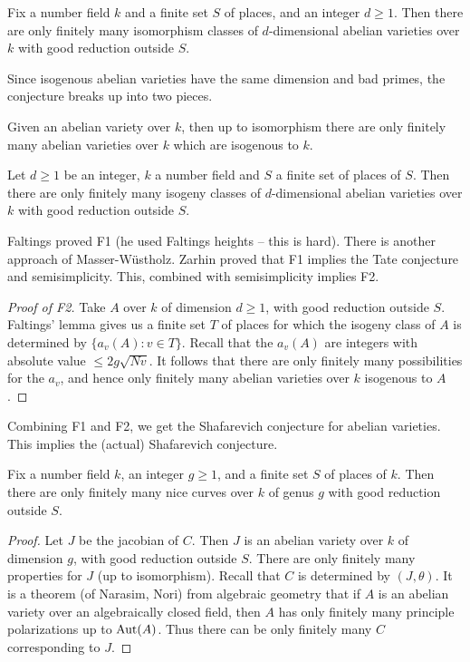 \begin{conjecture}
Fix a number field $k$ and a finite set $S$ of places, and an integer 
$d\geqslant 1$. Then there are only finitely many isomorphism classes of 
$d$-dimensional abelian varieties over $k$ with good reduction outside $S$. 
\end{conjecture}

Since isogenous abelian varieties have the same dimension and bad primes, 
the conjecture breaks up into two pieces. 

\begin{conjecture}[F1]
Given an abelian variety over $k$, then up to isomorphism there are only 
finitely many abelian varieties over $k$ which are isogenous to $k$. 
\end{conjecture}

\begin{conjecture}[F2]
Let $d\geqslant 1$ be an integer, $k$ a number field and $S$ a finite set of 
places of $S$. Then there are only finitely many isogeny classes of 
$d$-dimensional abelian varieties over $k$ with good reduction outside $S$. 
\end{conjecture}

Faltings proved F1 (he used Faltings heights -- this is hard). There is 
another approach of Masser-W\"ustholz. Zarhin proved that F1 implies the 
Tate conjecture and semisimplicity. This, combined with semisimplicity 
implies F2. 

\begin{proof}[Proof of F2]
Take $A$ over $k$ of dimension $d\geqslant 1$, with good reduction outside $S$. 
Faltings' lemma gives us a finite set $T$ of places for which the isogeny class 
of $A$ is determined by $\{a_v(A):v\in T\}$. Recall that the $a_v(A)$ are 
integers with absolute value $\leqslant 2 g\sqrt{N v}$. It follows that there 
are only finitely many possibilities for the $a_v$, and hence only finitely 
many abelian varieties over $k$ isogenous to $A$. 
\end{proof}

Combining F1 and F2, we get the Shafarevich conjecture for abelian varieties. 
This implies the (actual) Shafarevich conjecture. 

\begin{conjecture}
Fix a number field $k$, an integer $g\geqslant 1$, and a finite set $S$ of 
places of $k$. Then there are only finitely many nice curves over $k$ of genus 
$g$ with good reduction outside $S$. 
\end{conjecture}
\begin{proof}
Let $J$ be the jacobian of $C$. Then $J$ is an abelian variety over $k$ of 
dimension $g$, with good reduction outside $S$. There are only finitely many 
properties for $J$ (up to isomorphism). Recall that $C$ is determined by 
$(J,\theta)$. It is a theorem (of Narasim, Nori) from algebraic geometry that 
if $A$ is an abelian variety over an algebraically closed field, then $A$ has 
only finitely many principle polarizations up to $\operatorname{Aut}(A)$. Thus there can be 
only finitely many $C$ corresponding to $J$. 
\end{proof}

